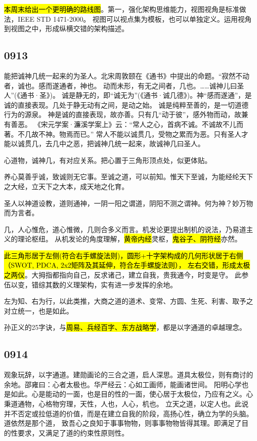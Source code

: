 \hl{本周末给出一个更明确的路线图}。第一，强化架构思维能力，视图视角是标准做法，IEEE STD 1471-2000。
视图可以视点集为模板，也可以单独定义。运用视角到视图之中，形成纵横交错的架构描述。

\subsection{0913}

\begin{shadequote}

能把诚神几统一起来的为圣人。北宋周敦颐在《通书》中提出的命题。“寂然不动者，诚也。感而遂通者，神也。
动而未形，有无之间者，几也。……诚神儿曰圣人”(《通书·圣》)。
诚是静无的，即“诚无为”(《通书·诚几德》)。神“感而遂通”，是诚的直接表现。几处于静无动有之间，是动之始。
诚是纯粹至善的，是一切道德行为的源泉。
神是诚的直接表现，故亦善。只有几“动于彼”，感外物而动，故兼有善恶。
《宋元学案·濂溪学案上》云：“常人之心，首病不诚。不诚故不儿而著。不几故不神。物焉而已。”
常人不能以诚贯几，受物之累而为恶。只有圣人才能以诚贯几，去几中之恶，把诚神几统一起来，故诚神几曰圣人。
\end{shadequote}

心道物，诚神几，有对应关系。把心置于三角形顶点处，似更体贴。

养心莫善乎诚，致诚则无它事。至诚之道，可以前知。惟天下至诚，为能经纶天下之大经，立天下之大本，成天地之化育。

圣人以神道设教，道则通神，一阴一阳之谓道，阴阳不测之谓神。何为神？妙万物而为言者。

几，人心惟危，道心惟微，几则合多义而言。机发论更提出制机的说法，乃易道主义的理论枢纽。
从机发论的角度理解，\hl{黄帝内经}灵枢，\hl{鬼谷子、阴符经}亦然。

\hl{此三角形居于左侧(符合右手螺旋法则)，圆形+十字架构成的几何形状居于右侧（SWOT, PDCA, 2x2矩阵及其延伸，符合左手螺旋法则），
左右交错，形成太极之两仪}。大拇指都指向自己，反求诸己，建立自我，贵我通今，时变是守。
此参伍以变，错综其数的义理架构，实有进一步发挥的余地。

左为知、右为行，以此类推，大商之道的道术、变常、方圆、生死、利害、取予之对立统一，也是如此。

孙正义的25字诀，与\hl{周易、兵经百字、东方战略学}，都是以字通道的卓越理念。

\subsection{0914}

观象玩辞，以字通道。建勋画论的三合之道，启人深思。道具太极位，则有商讨的余地。邵雍曰：心者太极也。华严经云：心如工画师，能画诸世间。
阳明心学也是如此。心是能动的一面，也是目的性的一面，使心居于太极位，乃应有之义。心秉道通物，心格物穷理，天性，人也，人心，机也。
立天之道，以定人也。此说并不否定或拉低道的价值，而是在建立自我的阶段，高扬心性，确立为学的头脑。道依然是那个道，
致吾心之良知于事事物物，则事事物物皆得其理。即满足了目的性要求，又满足了道的约束性原则性。

